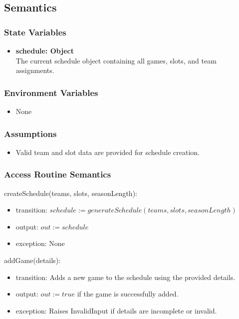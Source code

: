 \documentclass[12pt, titlepage]{article}
\begin{document}
\subsection{Semantics}

\subsubsection{State Variables}
\begin{itemize}
    \item \textbf{schedule: Object} \\ The current schedule object containing all games, slots, and team assignments.
\end{itemize}

\subsubsection{Environment Variables}
\begin{itemize}
    \item None
\end{itemize}

\subsubsection{Assumptions}
\begin{itemize}
    \item Valid team and slot data are provided for schedule creation.
\end{itemize}

\subsubsection{Access Routine Semantics}

\noindent createSchedule(teams, slots, seasonLength):
\begin{itemize}
    \item transition: $schedule := generateSchedule(teams, slots, seasonLength)$
    \item output: $out := schedule$
    \item exception: None
\end{itemize}

\noindent addGame(details):
\begin{itemize}
    \item transition: Adds a new game to the schedule using the provided details.
    \item output: $out := true$ if the game is successfully added.
    \item exception: Raises InvalidInput if details are incomplete or invalid.
\end{itemize}
\end{document}
